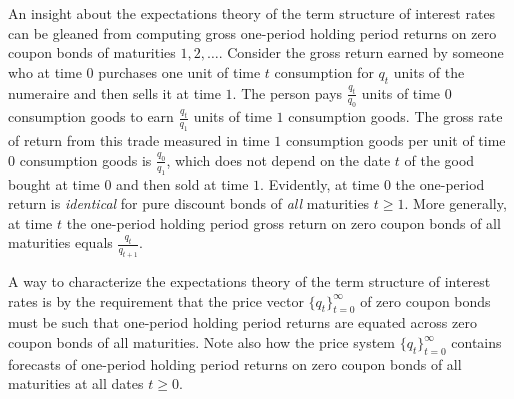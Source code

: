 


An insight about the expectations theory of the term structure of interest rates can be gleaned from computing  gross one-period holding period
 returns on zero coupon bonds of maturities $1, 2, \ldots$.  Consider the gross return earned by someone who at time $0$ purchases one unit of time $t$ consumption for  $q_t$ units
of the numeraire and  then sells it
at time $1$.  The person pays ${\frac{q_t}{q_0}}$ units of time $0$ consumption goods to earn ${\frac{q_t}{q_1}}$ units of time $1$
 consumption goods.  The gross rate of return from this trade  measured in time $1$ consumption goods per unit of time $0$ consumption goods
 is ${\frac{q_0}{q_1}}$, which does not depend on the date $t$ of the good bought at time $0$ and then sold at time $1$.
   Evidently,  at time $0$ the one-period return is {\it identical\/} for pure discount
bonds of {\it all\/} maturities $t \geq 1$.  More generally, at time $t$ the one-period holding period gross return on zero coupon bonds of all maturities
equals ${\frac{q_{t}}{q_{t+1}}}$.

A  way to characterize the expectations theory of the term structure of interest rates is by the requirement
that the price vector $\{q_t\}_{t=0}^\infty$ of zero coupon bonds must be such that one-period holding period returns are equated across zero coupon bonds of
all maturities.  Note also how the price system $\{q_t\}_{t=0}^\infty$ contains forecasts of one-period holding period returns on zero coupon bonds of all maturities
at all dates $t \geq 0$. %
%


